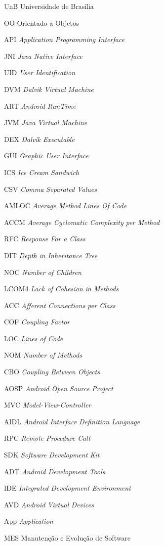\begin{siglas}

  \item[UnB] Universidade de Brasília
  \item[OO] Orientado a Objetos
  \item[API] \textit{Application Programming Interface}
  \item[JNI] \textit{Java Native Interface}
  \item[UID] \textit{User Identification}
  \item[DVM] \textit{Dalvik Virtual Machine}
  \item[ART] \textit{Android RunTime}
  \item[JVM] \textit{Java Virtual Machine}
  \item[DEX] \textit{Dalvik Executable}
  \item[GUI] \textit{Graphic User Interface}
  \item[ICS] \textit{Ice Cream Sandwich}
  \item[CSV] \textit{Comma Separated Values}
  \item[AMLOC]\textit{Average Method Lines Of Code}
  \item[ACCM] \textit{Average Cyclomatic Complexity per Method}
  \item[RFC] \textit{Response For a Class}
  \item[DIT] \textit{Depth in Inheritance Tree}
  \item[NOC] \textit{Number of Children}
  \item[LCOM4] \textit{Lack of Cohesion in Methods}
  \item[ACC] \textit{Afferent Connections per Class}
  \item[COF] \textit{Coupling Factor}
  \item[LOC] \textit{Lines of Code}
  \item[NOM] \textit{Number of Methods}
  \item[CBO] \textit{Coupling Between Objects}
  \item[AOSP] \textit{Android Open Source Project}
  \item[MVC] \textit{Model-View-Controller}
  \item[AIDL] \textit{Android Interface Definition Language}
  \item[RPC] \textit{Remote Procedure Call}
  \item[SDK] \textit{Software Development Kit}
  \item[ADT] \textit{Android Development Tools}
  \item[IDE] \textit{Integrated Development Environment}
  \item[AVD] \textit{Android Virtual Devices} 
  \item[App] \textit{Application}
  \item[MES] Manutenção e Evolução de Software

\end{siglas}

